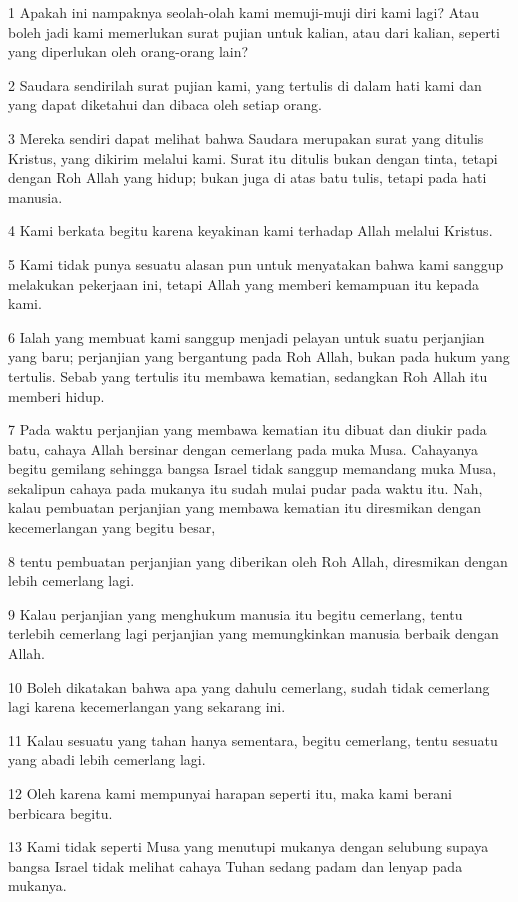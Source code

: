 \par 1 Apakah ini nampaknya seolah-olah kami memuji-muji diri kami lagi? Atau boleh jadi kami memerlukan surat pujian untuk kalian, atau dari kalian, seperti yang diperlukan oleh orang-orang lain?
\par 2 Saudara sendirilah surat pujian kami, yang tertulis di dalam hati kami dan yang dapat diketahui dan dibaca oleh setiap orang.
\par 3 Mereka sendiri dapat melihat bahwa Saudara merupakan surat yang ditulis Kristus, yang dikirim melalui kami. Surat itu ditulis bukan dengan tinta, tetapi dengan Roh Allah yang hidup; bukan juga di atas batu tulis, tetapi pada hati manusia.
\par 4 Kami berkata begitu karena keyakinan kami terhadap Allah melalui Kristus.
\par 5 Kami tidak punya sesuatu alasan pun untuk menyatakan bahwa kami sanggup melakukan pekerjaan ini, tetapi Allah yang memberi kemampuan itu kepada kami.
\par 6 Ialah yang membuat kami sanggup menjadi pelayan untuk suatu perjanjian yang baru; perjanjian yang bergantung pada Roh Allah, bukan pada hukum yang tertulis. Sebab yang tertulis itu membawa kematian, sedangkan Roh Allah itu memberi hidup.
\par 7 Pada waktu perjanjian yang membawa kematian itu dibuat dan diukir pada batu, cahaya Allah bersinar dengan cemerlang pada muka Musa. Cahayanya begitu gemilang sehingga bangsa Israel tidak sanggup memandang muka Musa, sekalipun cahaya pada mukanya itu sudah mulai pudar pada waktu itu. Nah, kalau pembuatan perjanjian yang membawa kematian itu diresmikan dengan kecemerlangan yang begitu besar,
\par 8 tentu pembuatan perjanjian yang diberikan oleh Roh Allah, diresmikan dengan lebih cemerlang lagi.
\par 9 Kalau perjanjian yang menghukum manusia itu begitu cemerlang, tentu terlebih cemerlang lagi perjanjian yang memungkinkan manusia berbaik dengan Allah.
\par 10 Boleh dikatakan bahwa apa yang dahulu cemerlang, sudah tidak cemerlang lagi karena kecemerlangan yang sekarang ini.
\par 11 Kalau sesuatu yang tahan hanya sementara, begitu cemerlang, tentu sesuatu yang abadi lebih cemerlang lagi.
\par 12 Oleh karena kami mempunyai harapan seperti itu, maka kami berani berbicara begitu.
\par 13 Kami tidak seperti Musa yang menutupi mukanya dengan selubung supaya bangsa Israel tidak melihat cahaya Tuhan sedang padam dan lenyap pada mukanya.
